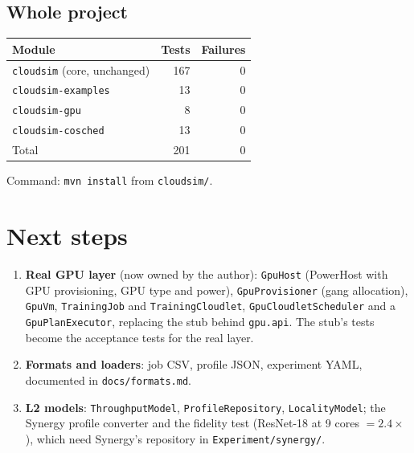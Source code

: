 \documentclass[11pt,a4paper]{article}
\newcommand{\code}[1]{\texttt{#1}}
\begin{document}
\subsection{Whole project}
\begin{center}
\begin{tabular}{@{}lrr@{}}
\toprule
Module & Tests & Failures \\
\midrule
\code{cloudsim} (core, unchanged) & 167 & 0 \\
\code{cloudsim-examples} & 13 & 0 \\
\code{cloudsim-gpu} & 8 & 0 \\
\code{cloudsim-cosched} & 13 & 0 \\
\midrule
Total & 201 & 0 \\
\bottomrule
\end{tabular}
\end{center}
Command: \code{mvn install} from \code{cloudsim/}.

\section{Next steps}
\begin{enumerate}
  \item \textbf{Real GPU layer} (now owned by the author): \code{GpuHost} (PowerHost with GPU
        provisioning, GPU type and power), \code{GpuProvisioner} (gang allocation), \code{GpuVm},
        \code{TrainingJob} and \code{TrainingCloudlet}, \code{GpuCloudletScheduler} and a
        \code{GpuPlanExecutor}, replacing the stub behind \code{gpu.api}. The stub's tests become
        the acceptance tests for the real layer.
  \item \textbf{Formats and loaders}: job CSV, profile JSON, experiment YAML, documented in
        \code{docs/formats.md}.
  \item \textbf{L2 models}: \code{ThroughputModel}, \code{ProfileRepository}, \code{LocalityModel};
        the Synergy profile converter and the fidelity test (ResNet-18 at 9 cores $= 2.4\times$),
        which need Synergy's repository in \code{Experiment/synergy/}.
\end{enumerate}
\end{document}
